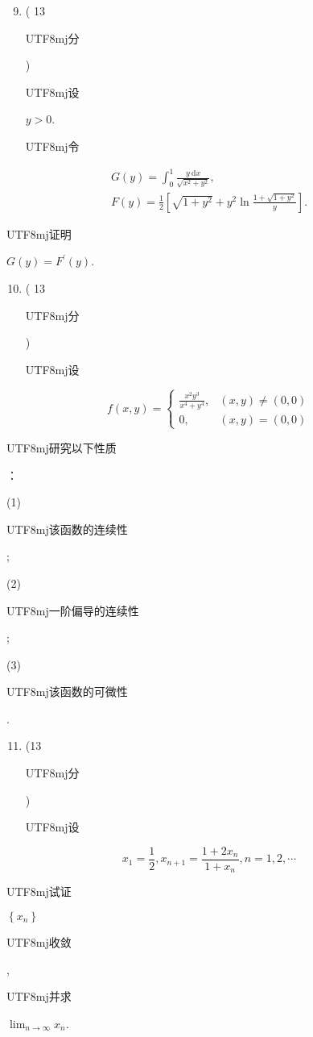 \documentclass[10pt]{article}
\begin{document}
\begin{enumerate}
  \setcounter{enumi}{8}
  \item ( 13 \begin{CJK}{UTF8}{mj}分\end{CJK}) \begin{CJK}{UTF8}{mj}设\end{CJK} $y>0$. \begin{CJK}{UTF8}{mj}令\end{CJK}
\end{enumerate}
$$
\begin{gathered}
G(y)=\int_{0}^{1} \frac{y \mathrm{~d} x}{\sqrt{x^{2}+y^{2}}}, \\
F(y)=\frac{1}{2}\left[\sqrt{1+y^{2}}+y^{2} \ln \frac{1+\sqrt{1+y^{2}}}{y}\right] .
\end{gathered}
$$
\begin{CJK}{UTF8}{mj}证明\end{CJK} $G(y)=F^{\prime}(y)$.

\begin{enumerate}
  \setcounter{enumi}{9}
  \item ( 13 \begin{CJK}{UTF8}{mj}分\end{CJK}) \begin{CJK}{UTF8}{mj}设\end{CJK}
\end{enumerate}
$$
f(x, y)= \begin{cases}\frac{x^{2} y^{3}}{x^{4}+y^{4}}, & (x, y) \neq(0,0) \\ 0, & (x, y)=(0,0)\end{cases}
$$
\begin{CJK}{UTF8}{mj}研究以下性质\end{CJK}：

(1) \begin{CJK}{UTF8}{mj}该函数的连续性\end{CJK};

(2) \begin{CJK}{UTF8}{mj}一阶偏导的连续性\end{CJK};

(3) \begin{CJK}{UTF8}{mj}该函数的可微性\end{CJK}.

\begin{enumerate}
  \setcounter{enumi}{10}
  \item (13 \begin{CJK}{UTF8}{mj}分\end{CJK}) \begin{CJK}{UTF8}{mj}设\end{CJK}
\end{enumerate}
$$
x_{1}=\frac{1}{2}, x_{n+1}=\frac{1+2 x_{n}}{1+x_{n}}, n=1,2, \cdots
$$
\begin{CJK}{UTF8}{mj}试证\end{CJK} $\left\{x_{n}\right\}$ \begin{CJK}{UTF8}{mj}收敛\end{CJK}, \begin{CJK}{UTF8}{mj}并求\end{CJK} $\lim _{n \rightarrow \infty} x_{n}$.
\end{document}
